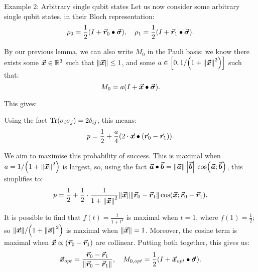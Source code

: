 \documentclass[a4paper]{article}
\begin{document}
\begin{parag}{Example 2: Arbitrary single qubit states}
    Let us now consider some arbitrary single qubit states, in their Bloch representation: 
    \[\rho_0 = \frac{1}{2}\left(I + \bvec{r}_0 \dotprod \bvec{\sigma}\right), \mathspace \rho_1 = \frac{1}{2}\left(I + \bvec{r}_1 \dotprod \bvec{\sigma}\right).\]

    By our previous lemma, we can also write $M_0$ in the Pauli basis: we know there exists some $\bm{\protect\vec{x}} \in \mathbb{R}^3$ such that $\left\|\bvec{x}\right\| \leq 1$, and some $a \in \left[0, 1/\left(1 + \left\|\bvec{x}\right\|^2\right)\right]$ such that: 
    \[M_0 = a\left(I + \bvec{x} \dotprod \bvec{\sigma}\right).\]
    
    This gives: 
    
    Using the fact $\Tr\left(\sigma_i \sigma_j\right) = 2 \delta_{ij}$, this means: 
    \[p = \frac{1}{2} + \frac{a}{4}\left(2\cdot \bvec{x} \dotprod \left(\bvec{r}_0 - \bvec{r}_1\right)\right).\]

    We aim to maximise this probability of success. This is maximal when $a = 1/\left(1 + \left\|\bvec{x}\right\|^2\right)$ is largest, so, using the fact $\bvec{a} \dotprod \bvec{b} = \left\|\bvec{a}\right\| \left\|\bvec{b}\right\| \cos\left(\bvec{a}; \bvec{b}\right)$, this simplifies to: 
    \[p = \frac{1}{2} + \frac{1}{2} \cdot \frac{1}{1 + \left\|\bvec{x}\right\|^2} \left\|\bvec{x}\right\| \left\|\bvec{r}_0 - \bvec{r}_1\right\| \cos\left(\bvec{x}; \bvec{r}_0 - \bvec{r}_1\right).\]
    
    It is possible to find that $f\left(t\right) = \frac{t}{1 + t^2}$ is maximal when $t = 1$, where $f\left(1\right) = \frac{1}{2}$; so $\left\|\bvec{x}\right\| / \left(1 + \left\|\bvec{x}\right\|^2\right)$ is maximal when $\left\|\bvec{x}\right\| = 1$. Moreover, the cosine term is maximal when $\bvec{x} \propto \left(\bvec{r}_0 - \bvec{r}_1\right)$ are collinear. Putting both together, this gives us:
    \[\bvec{x}_{opt} = \frac{\bvec{r}_0 - \bvec{r}_1}{\left\|\bvec{r}_0 - \bvec{r}_1\right\|}, \mathspace M_{0, opt} = \frac{1}{2}\left(I + \bvec{x}_{opt} \dotprod \bvec{\sigma}\right).\]
    

\end{parag}
\end{document}
